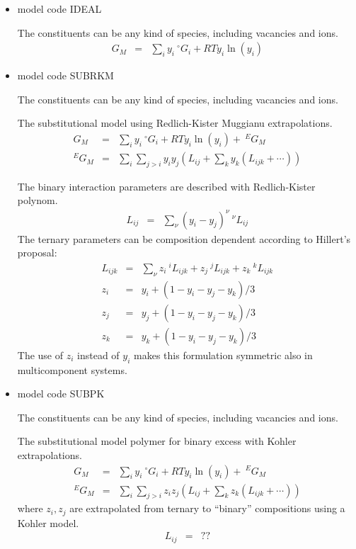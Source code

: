 \documentclass[12pt]{article}
\begin{document}
\begin{itemize}
\item model code IDEAL

  The constituents can be any kind of species, including vacancies and
  ions.
  \begin{eqnarray}
    G_M &=& \sum_i y_i~^{\circ}G_i + RT y_i\ln(y_i)\label{eq:ideal}
  \end{eqnarray}

\item model code SUBRKM

  The constituents can be any kind of species, including vacancies and
  ions.

  The substitutional model using Redlich-Kister Muggianu extrapolations.
  \begin{eqnarray}
    G_M &=& \sum_i y_i~^{\circ}G_i + RT y_i\ln(y_i) + ~^EG_M\\
    ^EG_M &=& \sum_i \sum_{j>i} y_i y_j (L_{ij} + \sum_k y_k (L_{ijk} + \cdots))
  \end{eqnarray}

  The binary interaction parameters are described with Redlich-Kister polynom.
  \begin{eqnarray}
    L_{ij} &=& \sum_{\nu} (y_i-y_j)^{\nu} ~^{\nu}L_{ij}\label{eq:rk2}
  \end{eqnarray}
  The ternary parameters can be composition dependent according to Hillert's
  proposal\cite{80Hil}:
  \begin{eqnarray}
    L_{ijk}&=&\sum_{\nu}z_i ~^iL_{ijk}+z_j ~^jL_{ijk}+z_k ~^kL_{ijk}\label{eq:tern}\\
    z_i &=& y_i +(1-y_i-y_j-y_k)/3\nonumber\\
    z_j &=& y_j +(1-y_i-y_j-y_k)/3\\
    z_k &=& y_k +(1-y_i-y_j-y_k)/3\nonumber
  \end{eqnarray}
  The use of $z_i$ instead of $y_i$ makes this formulation symmetric
  also in multicomponent systems.

\item model code SUBPK

  The constituents can be any kind of species, including vacancies and
  ions.

  The substitutional model polymer for binary excess with Kohler
  extrapolations.
  \begin{eqnarray}
    G_M &=& \sum_i y_i~^{\circ}G_i + RT y_i\ln(y_i) + ~^EG_M\\
    ^EG_M &=& \sum_i \sum_{j>i} z_i z_j (L_{ij} + \sum_k z_k (L_{ijk} + \cdots))
  \end{eqnarray}
  where $z_i, z_j$ are extrapolated from ternary to ``binary''
  compositions using a Kohler model.  
  \begin{eqnarray}
    L_{ij} &=& ??\label{eq:polex}
  \end{eqnarray}


\end{itemize}
\end{document}
